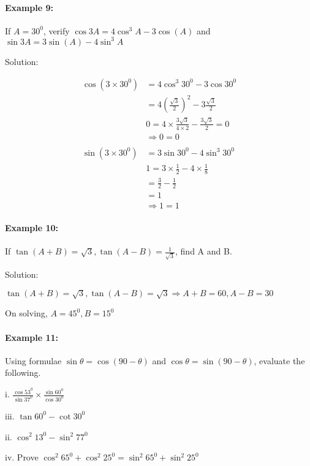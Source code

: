 \documentclass{article}
\begin{document}
\paragraph{Example 9:}
If $A = 30^{0}$, verify $\cos3A = 4\cos^{3}A - 3 \cos(A) $ and $\sin3A = 3\sin(A) - 4\sin^{3}A$

{\small Solution:}

\[
  \begin{aligned}
    \cos(3 \times 30^{0}) &= 4\cos^{3}30^{0} - 3\cos30^{0} \\
                         &= 4\left(\frac{\sqrt{3}}{2}\right)^{2} - 3\frac{\sqrt{3}}{2} \\
                         & 0 = 4 \times \frac{3\sqrt{3}}{4\times2} - \frac{3\sqrt{3}}{2} = 0 \\
                         &\Rightarrow 0 = 0 \\
    \\
    \sin(3 \times 30^{0}) &= 3\sin30^{0} - 4\sin^{3}30^{0} \\
                         & 1 = 3 \times \frac{1}{2} - 4 \times \frac{1}{8} \\
                         & = \frac{3}{2} - \frac{1}{2} \\
                         & = 1 \\
                         &\Rightarrow 1 = 1
  \end{aligned}
\]

\paragraph{Example 10:}
If $\tan(A+B) = \sqrt{3}, \tan(A-B)=\frac{1}{\sqrt{3}}$, find A and B.

{\small Solution:}

$\tan(A+B) = \sqrt{3}, \tan(A-B) = \sqrt{3} \Rightarrow A + B = 60, A - B = 30$

On solving, $A = 45^{0}, B = 15^{0}$

\paragraph{Example 11:}
Using formulae $\sin\theta = \cos(90-\theta)$ and $\cos\theta = \sin(90-\theta)$, evaluate the following.

\begin{enumerate}
        \begin{paracol}{2}
          \item[i.] $\frac{\cos53^{0}}{\sin37^{0}} \times \frac{\sin60^{0}}{\cos30^{0}}$
          \item[iii.] $\tan60^{0} - \cot30^{0}$
          \switchcolumn
          \item[ii.] $\cos^{2}13^{0} - \sin^{2}77^{0}$
          \item[iv.] Prove $\cos^{2}65^{0} + \cos^{2}25^{0} = \sin^{2}65^{0} + \sin^{2}25^{0}$
          \switchcolumn
        \end{paracol}
\end{enumerate}
\end{document}
